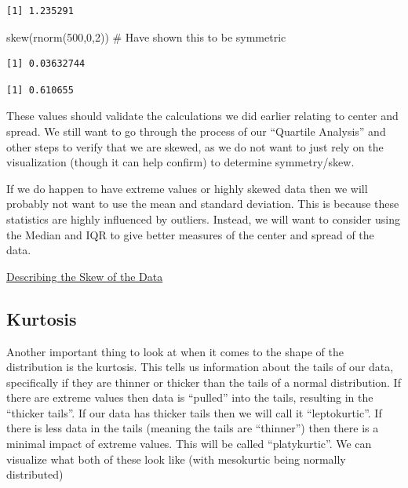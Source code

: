 \documentclass[
  letterpaper,
  DIV=11,
  numbers=noendperiod]{scrreprt}
\newenvironment{Shaded}{\begin{snugshade}}{\end{snugshade}}
\newcommand{\CommentTok}[1]{\textcolor[rgb]{0.37,0.37,0.37}{#1}}
\newcommand{\DecValTok}[1]{\textcolor[rgb]{0.68,0.00,0.00}{#1}}
\newcommand{\FunctionTok}[1]{\textcolor[rgb]{0.28,0.35,0.67}{#1}}
\newcommand{\NormalTok}[1]{\textcolor[rgb]{0.00,0.23,0.31}{#1}}
\newcommand{\SpecialCharTok}[1]{\textcolor[rgb]{0.37,0.37,0.37}{#1}}
\begin{document}
\begin{verbatim}
[1] 1.235291
\end{verbatim}

\begin{Shaded}
\begin{Highlighting}[]
\FunctionTok{skew}\NormalTok{(}\FunctionTok{rnorm}\NormalTok{(}\DecValTok{500}\NormalTok{,}\DecValTok{0}\NormalTok{,}\DecValTok{2}\NormalTok{)) }\CommentTok{\# Have shown this to be symmetric}
\end{Highlighting}
\end{Shaded}

\begin{verbatim}
[1] 0.03632744
\end{verbatim}

\begin{Shaded}
\end{Shaded}

\begin{verbatim}
[1] 0.610655
\end{verbatim}

These values should validate the calculations we did earlier relating to
center and spread. We still want to go through the process of our
``Quartile Analysis'' and other steps to verify that we are skewed, as
we do not want to just rely on the visualization (though it can help
confirm) to determine symmetry/skew.

If we do happen to have extreme values or highly skewed data then we
will probably not want to use the mean and standard deviation. This is
because these statistics are highly influenced by outliers. Instead, we
will want to consider using the Median and IQR to give better measures
of the center and spread of the data.

\begin{watch}{}{}
    \href{https://youtu.be/_VHtL0hgaKA}{Describing the Skew of the Data}
\end{watch}

\subsection{Kurtosis}\label{kurtosis}

Another important thing to look at when it comes to the shape of the
distribution is the kurtosis. This tells us information about the tails
of our data, specifically if they are thinner or thicker than the tails
of a normal distribution. If there are extreme values then data is
``pulled'' into the tails, resulting in the ``thicker tails''. If our
data has thicker tails then we will call it ``leptokurtic''. If there is
less data in the tails (meaning the tails are ``thinner'') then there is
a minimal impact of extreme values. This will be called ``platykurtic''.
We can visualize what both of these look like (with mesokurtic being
normally distributed)
\end{document}
